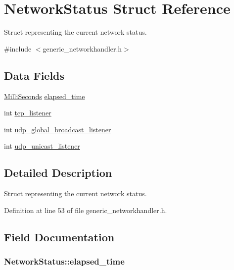 \hypertarget{structNetworkStatus}{\section{\-Network\-Status \-Struct \-Reference}
\label{df/d80/structNetworkStatus}
}


\-Struct representing the current network status.  




{\ttfamily \#include $<$generic\-\_\-networkhandler.\-h$>$}

\subsection*{\-Data \-Fields}
\begin{DoxyCompactItemize}
\item 
\hyperlink{typedefs_8h_a2972c9424f18b12265ca35d0548da82a}{\-Milli\-Seconds} \hyperlink{structNetworkStatus_a5b55928301fed3505a4cf80548d82e4a}{elapsed\-\_\-time}
\item 
int \hyperlink{structNetworkStatus_ac66cc7ac2af61a23198ca5adc88c80e7}{tcp\-\_\-listener}
\item 
int \hyperlink{structNetworkStatus_a633b353c84264794069fa8951f22e754}{udp\-\_\-global\-\_\-broadcast\-\_\-listener}
\item 
int \hyperlink{structNetworkStatus_aeb6f839f93df9d0b639415702f68c811}{udp\-\_\-unicast\-\_\-listener}
\end{DoxyCompactItemize}


\subsection{\-Detailed \-Description}
\-Struct representing the current network status. 



\-Definition at line 53 of file generic\-\_\-networkhandler.\-h.



\subsection{\-Field \-Documentation}
\hypertarget{structNetworkStatus_a5b55928301fed3505a4cf80548d82e4a}{
\subsubsection[{elapsed\-\_\-time}]{ {\bf \-Network\-Status\-::elapsed\-\_\-time}}}\label{df/d80/structNetworkStatus_a5b55928301fed3505a4cf80548d82e4a}


